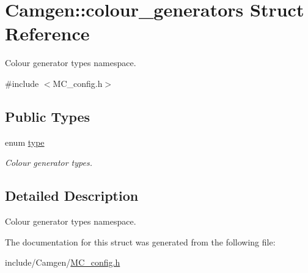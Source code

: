 \hypertarget{a00088}{\section{Camgen\-:\-:colour\-\_\-generators Struct Reference}
\label{a00088}
}


Colour generator types namespace.  




{\ttfamily \#include $<$M\-C\-\_\-config.\-h$>$}

\subsection*{Public Types}
\begin{DoxyCompactItemize}
\item 
enum \hyperlink{a00088_af5ebbb0f77f0cac3c4959f2a880a2f1c}{type} 
\begin{DoxyCompactList}\small\item\em Colour generator types. \end{DoxyCompactList}\end{DoxyCompactItemize}


\subsection{Detailed Description}
Colour generator types namespace. 

The documentation for this struct was generated from the following file\-:\begin{DoxyCompactItemize}
\item 
include/\-Camgen/\hyperlink{a00670}{M\-C\-\_\-config.\-h}\end{DoxyCompactItemize}
